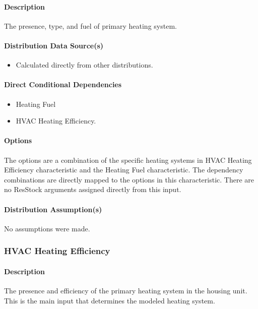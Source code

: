 \paragraph{Description}

The presence, type, and fuel of primary heating system.

\paragraph{Distribution Data Source(s)}
\begin{itemize}
    \item Calculated directly from other distributions.
\end{itemize}

\paragraph{Direct Conditional Dependencies}
\begin{itemize}
    \item Heating Fuel
    \item HVAC Heating Efficiency. 
\end{itemize}

\paragraph{Options}
The options are a combination of the specific heating systems in HVAC Heating Efficiency characteristic and the Heating Fuel characteristic. The dependency combinations are directly mapped to the options in this characteristic. There are no ResStock arguments assigned directly from this input. 

\paragraph{Distribution Assumption(s)}
No assumptions were made.

\subsubsection{HVAC Heating Efficiency}
\paragraph{Description}
The presence and efficiency of the primary heating system in the housing unit. This is the main input that determines the modeled heating system.

